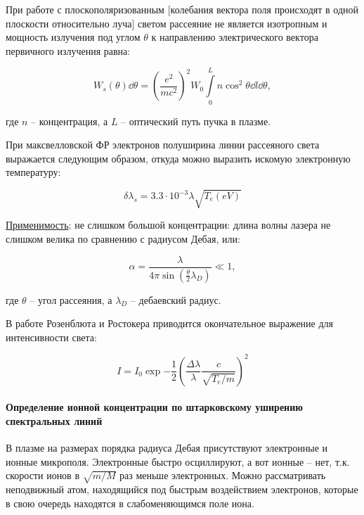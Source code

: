 \documentclass[10pt, a4paper]{article}
\begin{document}
При работе с плоскополяризованным [колебания вектора поля происходят в одной плоскости относительно луча] светом рассеяние не является изотропным и мощность излучения под углом $\theta$ к направлению электрического вектора первичного излучения равна:

\begin{equation*}
	W_{s}(\theta)\dd{\theta}= \left(\frac{e^2}{mc^2}\right)^2 W_0 \int\limits_0^L n\cos^{2}\theta\dd{l}\dd{\theta},
\end{equation*}

где $n$ -- концентрация, а $L$ -- оптический путь пучка в плазме.

При максвелловской ФР электронов полуширина линии рассеяного света выражается следующим образом, откуда можно выразить искомую электронную температуру:

\begin{equation*}
	\delta \lambda_s = 3.3\cdot10^{-3} \lambda \sqrt{T_e (eV)}
\end{equation*}

\uline{Применимость}: не слишком большой концентрации: длина волны лазера не слишком велика по сравнению с радиусом Дебая, или:

\begin{equation*}
	\alpha = \frac{\lambda}{4\pi \sin(\frac{\theta}{2} \lambda_D)} \ll 1,
\end{equation*}

где $\theta$ -- угол рассеяния, а $\lambda_D$ -- дебаевский радиус.

В работе Розенблюта и Ростокера приводится окончательное выражение для интенсивности света:

\begin{equation*}
	I=I_0 \exp{- \frac{1}{2} \left(\frac{\Delta\lambda}{\lambda} \frac{c}{\sqrt{T_e /m}}\right)^2}
\end{equation*}

\paragraph{Определение ионной концентрации по штарковскому уширению спектральных линий}

В плазме на размерах порядка радиуса Дебая присутствуют электронные и ионные микрополя. Электронные быстро осциллируют, а вот ионные -- нет, т.к. скорости ионов в $\sqrt{m/M}$ раз меньше электронных. Можно рассматривать неподвижный атом, находящийся под быстрым воздействием электронов, которые в свою очередь находятся в слабоменяющимся поле иона.
\end{document}
